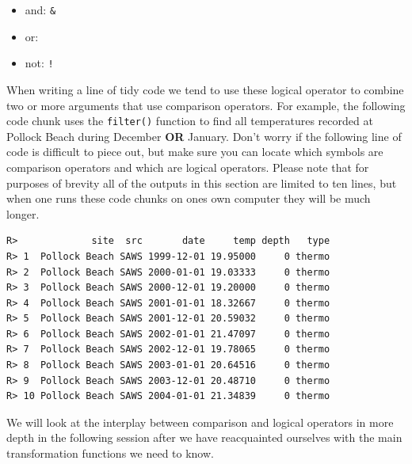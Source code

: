 \documentclass[]{book}
\newenvironment{Shaded}{\begin{snugshade}}{\end{snugshade}}
\newcommand{\KeywordTok}[1]{\textcolor[rgb]{0.13,0.29,0.53}{\textbf{#1}}}
\newcommand{\DecValTok}[1]{\textcolor[rgb]{0.00,0.00,0.81}{#1}}
\newcommand{\StringTok}[1]{\textcolor[rgb]{0.31,0.60,0.02}{#1}}
\newcommand{\OperatorTok}[1]{\textcolor[rgb]{0.81,0.36,0.00}{\textbf{#1}}}
\newcommand{\NormalTok}[1]{#1}
\providecommand{\tightlist}{%
  \setlength{\itemsep}{0pt}\setlength{\parskip}{0pt}}
\theoremstyle{definition}
\theoremstyle{definition}
\theoremstyle{definition}
\theoremstyle{remark}
\begin{document}
\begin{itemize}
\tightlist
\item
  and: \texttt{\&}\\
\item
  or: \texttt{\textbar{}}\\
\item
  not: \texttt{!}
\end{itemize}

When writing a line of tidy code we tend to use these logical operator
to combine two or more arguments that use comparison operators. For
example, the following code chunk uses the \texttt{filter()} function to
find all temperatures recorded at Pollock Beach during December
\textbf{OR} January. Don't worry if the following line of code is
difficult to piece out, but make sure you can locate which symbols are
comparison operators and which are logical operators. Please note that
for purposes of brevity all of the outputs in this section are limited
to ten lines, but when one runs these code chunks on ones own computer
they will be much longer.

\begin{Shaded}
\end{Shaded}

\begin{verbatim}
R>             site  src       date     temp depth   type
R> 1  Pollock Beach SAWS 1999-12-01 19.95000     0 thermo
R> 2  Pollock Beach SAWS 2000-01-01 19.03333     0 thermo
R> 3  Pollock Beach SAWS 2000-12-01 19.20000     0 thermo
R> 4  Pollock Beach SAWS 2001-01-01 18.32667     0 thermo
R> 5  Pollock Beach SAWS 2001-12-01 20.59032     0 thermo
R> 6  Pollock Beach SAWS 2002-01-01 21.47097     0 thermo
R> 7  Pollock Beach SAWS 2002-12-01 19.78065     0 thermo
R> 8  Pollock Beach SAWS 2003-01-01 20.64516     0 thermo
R> 9  Pollock Beach SAWS 2003-12-01 20.48710     0 thermo
R> 10 Pollock Beach SAWS 2004-01-01 21.34839     0 thermo
\end{verbatim}

We will look at the interplay between comparison and logical operators
in more depth in the following session after we have reacquainted
ourselves with the main transformation functions we need to know.
\end{document}
